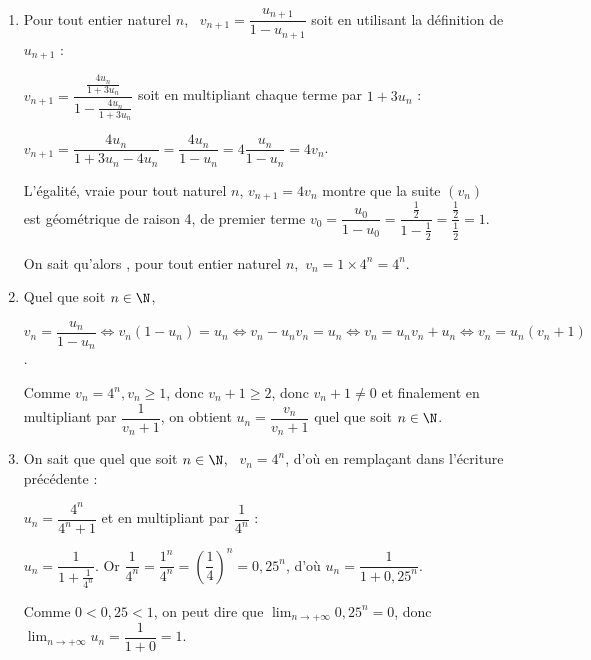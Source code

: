 \begin{enumerate}
	\begin{enumerate}
		\item 

Pour tout entier naturel $n$, \, $v_{n+1}  = \dfrac{u_{n+1}}{1 - u_{n+1}}$ soit en utilisant la définition de $u_{n+1}$ :

$v_{n+1}  = \dfrac{\frac{4u_n}{1 + 3u_n}}{1 - \frac{4u_n}{1 + 3u_n}}$ soit en multipliant chaque terme par $1 + 3u_n$ :

$v_{n+1} = \dfrac{4u_n}{1 + 3u_n - 4u_n} = \dfrac{4u_n}{1 - u_n} = 4\dfrac{u_n}{1 - u_n} = 4v_n$.

L'égalité, vraie pour tout naturel $n$, $v_{n+1} = 4v_n$ montre que la suite $\left(v_n\right)$ est géométrique de raison 4, de premier terme $v_0 = \dfrac{u_0}{1 - u_0} = \dfrac{\frac{1}{2}}{1 - \frac{1}{2}} = \dfrac{\frac{1}{2}}{\frac{1}{2}} = 1$.
	

On sait qu'alors , pour tout entier naturel $n$,\, $v_n = 1 \times 4^n = 4^n$.
		\item 
Quel que soit $n \in \N$,

$v_n  = \dfrac{u_n}{1 - u_n}\iff v_n\left( 1 - u_n\right) = u_n \iff v_n - u_nv_n = u_n \iff v_n = u_nv_n + u_n \iff v_n = u_n\left(v_n + 1 \right)$.

Comme $v_n = 4^n, v_n \geqslant 1$, donc $v_n + 1 \geqslant 2$, donc $v_n + 1 \ne 0$ et finalement en multipliant par $\dfrac{1}{v_n + 1}$, on obtient $u_n = \dfrac{v_n}{v_n + 1}$ quel que soit $n \in \N$.
		\item 
		

On sait que quel que soit $n \in \N$, \, $v_n = 4^n$, d'où en remplaçant dans l'écriture précédente :

$u_n = \dfrac{4^n}{4^n +1}$ et en multipliant par $\dfrac{1}{4^n}$ :

$u_n = \dfrac{1}{1 + \frac{1}{4^n}}$. Or $\dfrac{1}{4^n} = \dfrac{1^n}{4^n} = \left(\dfrac{1}{4}\right)^n = 0,25^n$, d'où $u_n = \dfrac{1}{1 + 0,25^n}$.



Comme $0 < 0,25 < 1$, on peut dire que $\displaystyle\lim_{n \to + \infty} 0,25^n = 0$, donc $\displaystyle\lim_{n \to + \infty}  u_n = \dfrac{1}{1+0} = 1$.
	\end{enumerate}
\end{enumerate}
